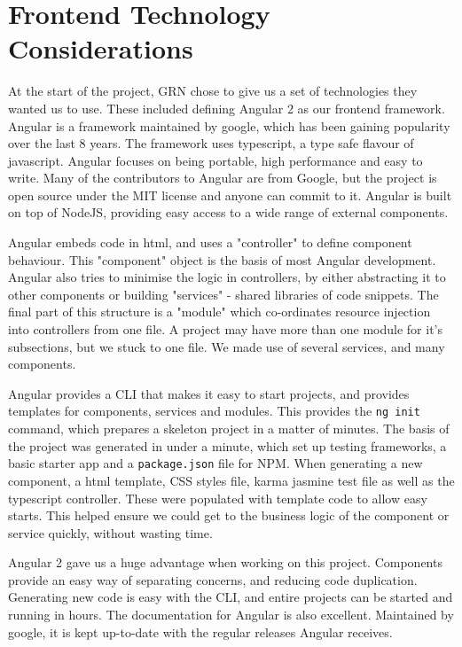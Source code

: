 \documentclass{l3proj}
\begin{document}
\section{Frontend Technology Considerations} %
\label{sec:frontend}

At the start of the project, GRN chose to give us a set of technologies they
 wanted us to use. These included defining Angular 2 as our frontend framework.
 Angular is a framework maintained by google, which has been gaining popularity
 over the last 8 years\cite{angularjsoverview}. The framework uses typescript,
 a type safe flavour of javascript. Angular focuses on being portable, high performance
 and easy to write\cite{angular_features}. Many of the contributors to Angular are
 from Google, but the project is open source under the MIT license and anyone can
 commit to it\cite{angularjsoverview}. Angular is built on top of NodeJS, providing
 easy access to a wide range of external components.

Angular embeds code in html, and uses a "controller" to define component behaviour. This
 "component" object is the basis of most Angular development. Angular also tries
 to minimise the logic in controllers, by either abstracting it to other components
 or building "services" - shared libraries of code snippets. The final part of this 
 structure is a "module" which co-ordinates resource injection into controllers from one
 file. A project may have more than one module for it's subsections, but we stuck to
 one file. We made use of several services, and many components.

Angular provides a CLI that makes it easy to start projects, and provides
 templates for components, services and modules. This provides the \texttt{ng init}
 command, which prepares a skeleton project in a matter of minutes.
 The basis of the project was generated in under a minute, which set up
 testing frameworks, a basic starter app and a \texttt{package.json} file for NPM.
 When generating a new component, a html template, CSS styles file, karma
 jasmine test file as well as the typescript controller. These were populated
 with template code to allow easy starts. This helped ensure we could get to
 the business logic of the component or service quickly, without wasting time.

  

Angular 2 gave us a huge advantage when working on this project. Components provide
 an easy way of separating concerns, and reducing code duplication. Generating new
 code is easy with the CLI, and entire projects can be started and running
 in hours. The documentation for Angular is also excellent. Maintained by google,
 it is kept up-to-date with the regular releases Angular receives.
\end{document}
